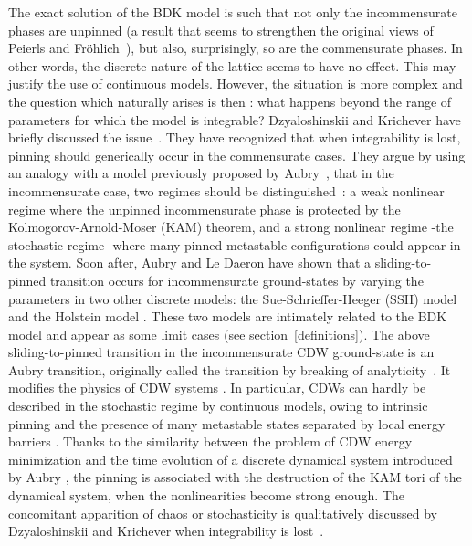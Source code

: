 \documentclass[]{revtex4-1}
\begin{document}
The exact solution of the BDK model is such that not only the incommensurate phases are unpinned (a result that seems to strengthen the original views of Peierls and Fr\"ohlich~\cite{peierls,frohlich}), but also, surprisingly, so are the commensurate phases. In other words, the discrete nature of the lattice seems to have no effect. This may justify the use of continuous models. 
However, the situation is more complex and the question which naturally arises is then : what happens beyond the range of parameters for which the model is integrable? Dzyaloshinskii and Krichever have briefly discussed the issue~\cite{DK}.  They have recognized that when integrability is lost, pinning should generically occur in the commensurate cases. They argue by using an analogy with a model previously proposed by Aubry~\cite{aubry0}, that in the incommensurate case, two regimes should be distinguished~\cite{DK}: a weak nonlinear regime where the unpinned incommensurate phase is protected by the Kolmogorov-Arnold-Moser (KAM) theorem, and a strong nonlinear regime -the stochastic regime- where many pinned metastable configurations could appear in the system. Soon after, Aubry and Le Daeron \cite{aubry_ledaeron} have shown that a sliding-to-pinned transition occurs for incommensurate ground-states by varying the parameters in two other discrete models: the Sue-Schrieffer-Heeger (SSH) model \cite{ssh} and the Holstein model \cite{holstein}. These two models are intimately related to the BDK model and appear as some limit cases (see section~\ref{definitions}). The above sliding-to-pinned transition in the incommensurate CDW ground-state is an Aubry transition, originally called the transition by breaking of analyticity~\cite{aubry0}.   It modifies the physics of CDW systems \cite{aubry_quemerais}. In particular, CDWs can hardly be described  in the stochastic regime by continuous models, owing to intrinsic pinning and the presence of many metastable states separated by local energy barriers \cite{quemerais}. 
Thanks to the similarity between the problem of CDW energy minimization and the time evolution of a discrete dynamical system introduced by Aubry \cite{aubry0}, the pinning is associated with the destruction of the KAM tori of the dynamical system, when the nonlinearities become strong enough. The concomitant apparition of chaos or stochasticity is qualitatively discussed by Dzyaloshinskii and Krichever when integrability is lost~\cite{DK}.

\end{document}
